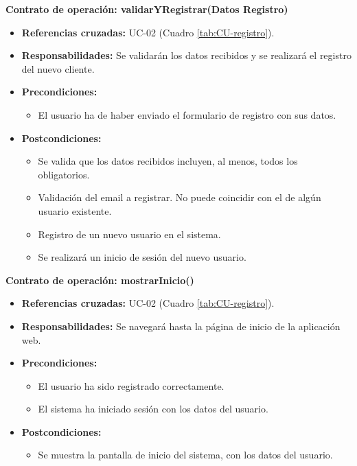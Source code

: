 \textbf{Contrato de operación: validarYRegistrar(Datos Registro)}
\begin{itemize}
\item \textbf{Referencias cruzadas:} UC-02 (Cuadro \ref{tab:CU-registro}).
\item \textbf{Responsabilidades:} Se validarán los datos recibidos y se realizará el registro del nuevo cliente.
\item \textbf{Precondiciones:} 
 \begin{itemize}
\item El usuario ha de haber enviado el formulario de registro con sus datos.
\end {itemize}
\item \textbf{Postcondiciones:} 
 \begin{itemize}
\item Se valida que los datos recibidos incluyen, al menos, todos los obligatorios.
\item Validación del email a registrar. No puede coincidir con el de algún usuario existente.
\item Registro de un nuevo usuario en el sistema.
\item Se realizará un inicio de sesión del nuevo usuario.
\end {itemize}
\end {itemize}

\textbf{Contrato de operación: mostrarInicio()}
\begin{itemize}
\item \textbf{Referencias cruzadas:} UC-02 (Cuadro \ref{tab:CU-registro}).
\item \textbf{Responsabilidades:} Se navegará hasta la página de inicio de la aplicación web.
\item \textbf{Precondiciones:} 
 \begin{itemize}
\item El usuario ha sido registrado correctamente.
\item El sistema ha iniciado sesión con los datos del usuario.
\end {itemize}
\item \textbf{Postcondiciones:} 
 \begin{itemize}
\item Se muestra la pantalla de inicio del sistema, con los datos del usuario.
\end {itemize}
\end {itemize}

\vspace{10mm}

